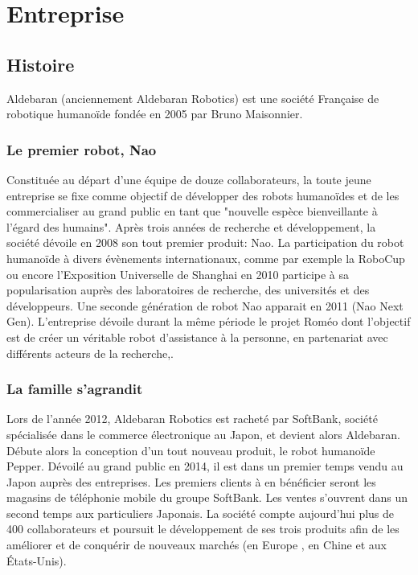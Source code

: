\chapter{Entreprise}
\label{Entreprise}
\thispagestyle{fancy}

\section{Histoire}
\label{Entreprise: histoire}
Aldebaran (anciennement Aldebaran Robotics) est une société Française de robotique humanoïde fondée en 2005 par Bruno Maisonnier. 

\subsection{Le premier robot, Nao}
\label{Entreprise:Histoire:Nao}
Constituée au départ d'une équipe de douze collaborateurs, la toute jeune entreprise se fixe comme objectif de développer des robots humanoïdes et de les commercialiser au grand public en tant que "nouvelle espèce bienveillante à l'égard des humains". Après trois années de recherche et développement, la société dévoile en 2008 son tout premier produit: Nao. La participation du robot humanoïde à divers évènements internationaux, comme par exemple la RoboCup ou encore l'Exposition Universelle de Shanghai en 2010 participe à sa popularisation auprès des laboratoires de recherche, des universités et des développeurs. Une seconde génération de robot Nao apparait en 2011 (Nao Next Gen). L'entreprise dévoile durant la même période le projet Roméo dont l'objectif est de créer un véritable robot d'assistance à la personne, en partenariat avec différents acteurs de la recherche,. 

\subsection{La famille s'agrandit}
\label{Entreprise: La famille Aldebaran}
Lors de l'année 2012, Aldebaran Robotics est racheté par SoftBank, société spécialisée dans le commerce électronique au Japon, et devient alors Aldebaran. Débute alors la conception d'un tout nouveau produit, le robot humanoïde Pepper. Dévoilé au grand public en 2014, il est dans un premier temps vendu au Japon auprès des entreprises. Les premiers clients à en bénéficier seront les magasins de téléphonie mobile du groupe SoftBank. Les ventes s'ouvrent dans un second temps aux particuliers Japonais. La société compte aujourd'hui plus de 400 collaborateurs et poursuit le développement de ses trois produits afin de les améliorer et de conquérir de nouveaux marchés (en Europe , en Chine et aux États-Unis).

